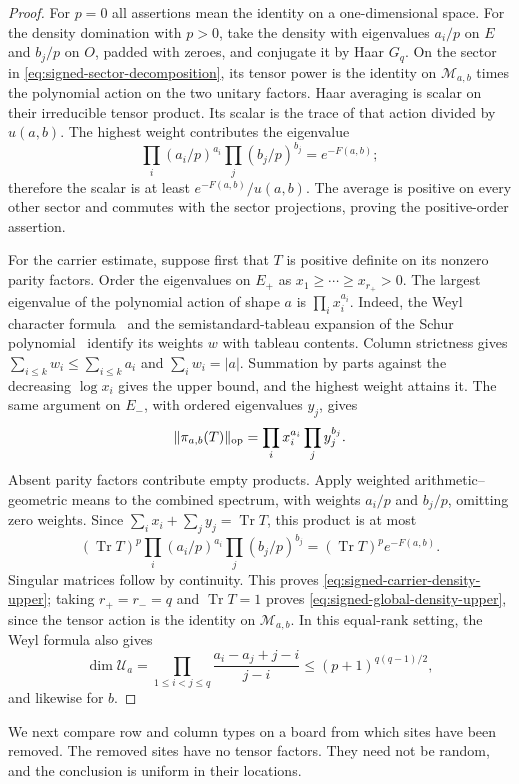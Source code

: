 \begin{proof}
For $p=0$ all assertions mean the identity on a one-dimensional space.
For the density domination with $p>0$, take the density with
eigenvalues $a_i/p$ on $E$ and $b_j/p$ on $O$, padded with zeroes,
and conjugate it by Haar $G_q$. On the
sector in \eqref{eq:signed-sector-decomposition}, its tensor power is
the identity on $\mathcal M_{a,b}$ times the polynomial action on the
two unitary factors. Haar averaging is scalar on their irreducible
tensor product. Its scalar is the trace of that action divided by
$u(a,b)$. The highest weight contributes the eigenvalue
\[
 \prod_i(a_i/p)^{a_i}\prod_j(b_j/p)^{b_j}=e^{-F(a,b)};
\]
therefore the scalar is at least $e^{-F(a,b)}/u(a,b)$. The average is
positive on every other sector and commutes with the sector
projections, proving the positive-order assertion.

For the carrier estimate, suppose first that $T$ is positive definite
on its nonzero parity factors. Order the eigenvalues on $E_+$ as
$x_1\ge\cdots\ge x_{r_+}>0$. The largest eigenvalue of the
polynomial action of shape $a$ is $\prod_i x_i^{a_i}$.
Indeed, the Weyl character formula~\cite[Theorem~4.63]{etingof} and
the semistandard-tableau expansion of the Schur
polynomial~\cite[\S3.1 and Theorem~3.2]{Lam2012} identify its weights
$w$ with tableau contents. Column strictness gives
$\sum_{i\le k}w_i\le\sum_{i\le k}a_i$ and $\sum_iw_i=|a|$.
Summation by parts against the decreasing $\log x_i$ gives the
upper bound, and the highest weight attains it. The same argument
on $E_-$, with ordered eigenvalues $y_j$, gives
\[
 \|\pi_{a,b}(T)\|_{\rm op}
 =\prod_i x_i^{a_i}\prod_j y_j^{b_j}.
\]
Absent parity factors contribute empty products. Apply weighted
arithmetic--geometric means to the combined spectrum, with weights
$a_i/p$ and $b_j/p$, omitting zero weights. Since
$\sum_i x_i+\sum_jy_j=\operatorname{Tr}T$, this product is at most
\[
 (\operatorname{Tr}T)^p
       \prod_i(a_i/p)^{a_i}\prod_j(b_j/p)^{b_j}
 =(\operatorname{Tr}T)^p e^{-F(a,b)}.
\]
Singular matrices follow by continuity. This proves
\eqref{eq:signed-carrier-density-upper}; taking $r_+=r_-=q$ and
$\operatorname{Tr}T=1$ proves
\eqref{eq:signed-global-density-upper}, since the tensor action is
the identity on $\mathcal M_{a,b}$. In this equal-rank setting, the
Weyl formula also gives
\[
 \dim\mathcal U_a
 =\prod_{1\le i<j\le q}\frac{a_i-a_j+j-i}{j-i}
 \le(p+1)^{q(q-1)/2},
\]
and likewise for $b$.
\end{proof}

We next compare row and column types on a board from which sites have
been removed. The removed sites have no tensor factors. They need not
be random, and the conclusion is uniform in their locations.

